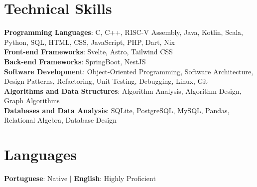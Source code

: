 \section{Technical Skills}
\begin{itemize}[leftmargin=0.15in, label={}]
    \small{
    \item{
        \textbf{Programming Languages}{: C, C++, RISC-V Assembly,
          Java, Kotlin, Scala, Python, SQL, HTML, CSS, JavaScript, PHP,
        Dart, Nix} \\
        \textbf{Front-end Frameworks}{: Svelte, Astro, Tailwind CSS} \\
        \textbf{Back-end Frameworks}{: SpringBoot, NestJS} \\
        \textbf{Software Development}{: Object-Oriented Programming,
          Software Architecture, Design Patterns, Refactoring, Unit
        Testing, Debugging, Linux, Git} \\
        \textbf{Algorithms and Data Structures}{: Algorithm Analysis,
        Algorithm Design, Graph Algorithms} \\
        \textbf{Databases and Data Analysis}{: SQLite, PostgreSQL,
        MySQL, Pandas, Relational Algebra, Database Design}
    }}
\end{itemize}

\section{Languages}
\begin{itemize}[leftmargin=0.15in, label={}]
    \small{
    \item{
        \textbf{Portuguese}{: Native} $|$
        \textbf{English}{: Highly Proficient}
    }}
\end{itemize}


